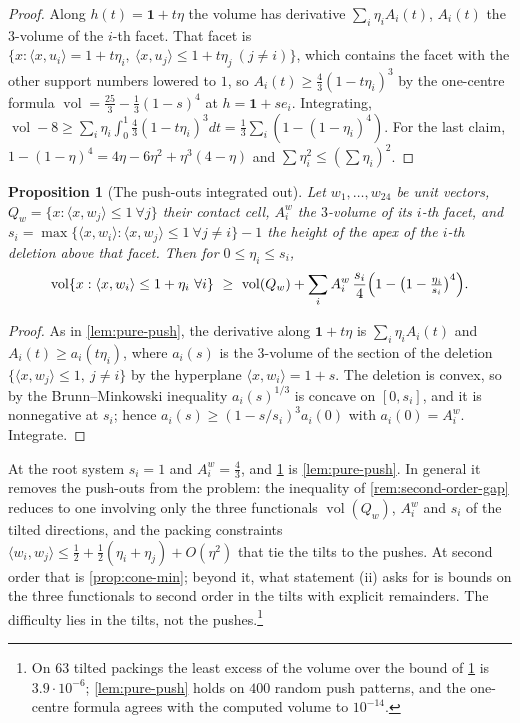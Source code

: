 \documentclass[11pt,reqno]{amsart}
\renewcommand{\_}{\origunderscore\allowbreak}
\numberwithin{equation}{section}
\theoremstyle{plain}
\newtheorem{prop}[thm]{Proposition}
\theoremstyle{definition}
\theoremstyle{remark}
\DeclareMathOperator{\vol}{vol}
\begin{document}
\begin{proof}
Along $h(t)=\mathbf 1+t\eta$ the volume has derivative $\sum_i\eta_iA_i(t)$,
$A_i(t)$ the $3$-volume of the $i$-th facet. That facet is
$\{x:\langle x,u_i\rangle=1+t\eta_i,\ \langle x,u_j\rangle\le1+t\eta_j\ (j\ne i)\}$,
which contains the facet with the other support numbers lowered to $1$, so
$A_i(t)\ge\tfrac43(1-t\eta_i)^3$ by the one-centre formula
$\vol=\tfrac{25}3-\tfrac13(1-s)^4$ at $h=\mathbf 1+se_i$. Integrating,
$\vol-8\ge\sum_i\eta_i\int_0^1\tfrac43(1-t\eta_i)^3dt=\tfrac13\sum_i(1-(1-\eta_i)^4)$.
For the last claim, $1-(1-\eta)^4=4\eta-6\eta^2+\eta^3(4-\eta)$ and
$\sum\eta_i^2\le(\sum\eta_i)^2$.
\end{proof}

\begin{prop}[The push-outs integrated out]\label{prop:push-integrated}
Let $w_1,\dots,w_{24}$ be unit vectors, $Q_w=\{x:\langle x,w_j\rangle\le1\ \forall j\}$
their contact cell, $A_i^w$ the $3$-volume of its $i$-th facet, and
$s_i=\max\{\langle x,w_i\rangle:\langle x,w_j\rangle\le1\ \forall j\ne i\}-1$ the
height of the apex of the $i$-th deletion above that facet. Then for
$0\le\eta_i\le s_i$,
\[
  \vol\{x:\langle x,w_i\rangle\le1+\eta_i\ \forall i\}\ \ge\
  \vol(Q_w)+\sum_i A_i^w\,\frac{s_i}{4}\Bigl(1-\bigl(1-\tfrac{\eta_i}{s_i}\bigr)^4\Bigr).
\]
\end{prop}

\begin{proof}
As in \cref{lem:pure-push}, the derivative along $\mathbf 1+t\eta$ is
$\sum_i\eta_iA_i(t)$ and $A_i(t)\ge a_i(t\eta_i)$, where $a_i(s)$ is the
$3$-volume of the section of the deletion $\{\langle x,w_j\rangle\le1,\ j\ne i\}$
by the hyperplane $\langle x,w_i\rangle=1+s$. The deletion is convex, so by
the Brunn--Minkowski inequality $a_i(s)^{1/3}$ is concave on $[0,s_i]$, and
it is nonnegative at $s_i$; hence $a_i(s)\ge(1-s/s_i)^3a_i(0)$ with
$a_i(0)=A_i^w$. Integrate.
\end{proof}

At the root system $s_i=1$ and $A_i^w=\tfrac43$, and
\cref{prop:push-integrated} is \cref{lem:pure-push}. In general it removes
the push-outs from the problem: the inequality of \cref{rem:second-order-gap}
reduces to one involving only the three functionals
$\vol(Q_w)$, $A_i^w$ and $s_i$ of the tilted directions, and the packing
constraints $\langle w_i,w_j\rangle\le\tfrac12+\tfrac12(\eta_i+\eta_j)+O(\eta^2)$
that tie the tilts to the pushes. At second order that is
\cref{prop:cone-min}; beyond it, what statement (ii) asks for is bounds on
the three functionals to second order in the tilts with explicit
remainders. The difficulty lies in the tilts, not the
pushes.\footnote{On $63$ tilted packings the least excess of the volume
  over the bound of \cref{prop:push-integrated} is $3.9\cdot10^{-6}$;
  \cref{lem:pure-push} holds on $400$ random push patterns, and the
  one-centre formula agrees with the computed volume to $10^{-14}$.}
\end{document}
